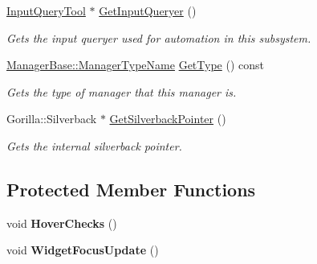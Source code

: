 \begin{DoxyCompactItemize}
\hyperlink{classphys_1_1InputQueryTool}{InputQueryTool} $\ast$ \hyperlink{classphys_1_1UIManager_a7b88d0fe2271cdceccf879eaba1b1a64}{GetInputQueryer} ()
\begin{DoxyCompactList}\small\item\em Gets the input queryer used for automation in this subsystem. \item\end{DoxyCompactList}\item 
\hyperlink{classphys_1_1ManagerBase_aaa6ccddf23892eaccb898529414f80a5}{ManagerBase::ManagerTypeName} \hyperlink{classphys_1_1UIManager_ab8fe74564ca5dc09cbe4b1cc2c007e79}{GetType} () const 
\begin{DoxyCompactList}\small\item\em Gets the type of manager that this manager is. \item\end{DoxyCompactList}\item 
Gorilla::Silverback $\ast$ \hyperlink{classphys_1_1UIManager_a21623edd39c3e23de29f4cf3ed6e490a}{GetSilverbackPointer} ()
\begin{DoxyCompactList}\small\item\em Gets the internal silverback pointer. \item\end{DoxyCompactList}\end{DoxyCompactItemize}
\subsection*{Protected Member Functions}
\begin{DoxyCompactItemize}
\item 
\hypertarget{classphys_1_1UIManager_ae5beaafe73c68d39eb84463033941057}{
void {\bfseries HoverChecks} ()}
\label{d5/dc5/classphys_1_1UIManager_ae5beaafe73c68d39eb84463033941057}

\item 
\hypertarget{classphys_1_1UIManager_aae0b6d575ea583154ca0257fb40d5ae7}{
void {\bfseries WidgetFocusUpdate} ()}
\label{d5/dc5/classphys_1_1UIManager_aae0b6d575ea583154ca0257fb40d5ae7}

\end{DoxyCompactItemize}
